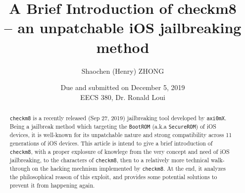 \documentclass[10pt]{article}
\title{\textbf{A Brief Introduction of checkm8} \\
        \large \textbf{-- an unpatchable iOS jailbreaking method\\}}
\author{Shaochen (Henry) ZHONG}
\date{Due and submitted on December 5, 2019\\EECS 380, Dr. Ronald Loui}
\newcommand{\inlinecode}{\texttt}
\begin{document}
\maketitle

\begin{abstract}
    \inlinecode{checkm8} is a recently released (Sep 27, 2019) jailbreaking tool developed by \inlinecode{axi0mX}. Being a jailbreak method which targeting the \inlinecode{BootROM} (a.k.a \inlinecode{SecureROM}) of iOS devices, it is well-known for its unpatchable nature and strong compatibility across 11 generations of iOS devices. This article is intend to give a brief introduction of \inlinecode{checkm8}, with a proper explosure of knowlege from the very concept and need of iOS jailbreaking, to the characters of \inlinecode{checkm8}, then to a relatively more technical walk-through on the hacking mechnism implemented by \inlinecode{checkm8}. At the end, it analyzes the philosophical reason of this exploit, and provides some potential solutions to prevent it from happening again.
\end{abstract}
\end{document}
